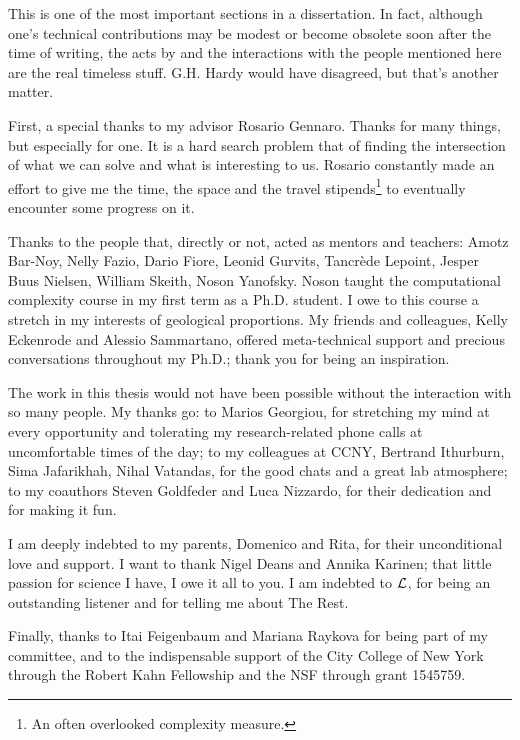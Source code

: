 %
%


This is one of the most important sections in a dissertation. In fact, although one's technical contributions may be modest or become obsolete soon after the time of writing, the acts by and the interactions with the people mentioned here are the real timeless stuff. G.H. Hardy would have disagreed, but that's another matter.

First, a special thanks to my advisor Rosario Gennaro. Thanks for many things, but especially for one. It is a hard search problem that of finding the intersection of what we can solve and what is interesting to us. Rosario constantly made an effort to give me the time,  the space and the travel stipends\footnote{An often overlooked complexity measure.} to eventually encounter some progress on it. 

Thanks to the people that, directly or not, acted as mentors and teachers: Amotz Bar-Noy, Nelly Fazio, Dario Fiore, Leonid Gurvits, Tancr\`ede Lepoint, Jesper Buus Nielsen, William Skeith, Noson Yanofsky. Noson taught the computational complexity course in my first term as a Ph.D. student. I owe to this course a stretch in my interests of geological proportions. My friends and colleagues, Kelly Eckenrode and Alessio Sammartano, offered meta-technical support and precious conversations throughout my Ph.D.; thank you for being an inspiration.

The work in this thesis would not have been possible without the interaction with so many people. My thanks go: to Marios Georgiou, for stretching my mind at every opportunity and tolerating my research-related phone calls at uncomfortable times of the day;
to my colleagues at CCNY, Bertrand Ithurburn, Sima Jafarikhah, Nihal Vatandas, for the good chats and a great lab atmosphere; 
to my coauthors Steven Goldfeder and Luca Nizzardo, for their dedication and for making it fun. 

I am deeply indebted to my parents, Domenico and Rita, for their unconditional love and support. I want to thank Nigel Deans and Annika Karinen; that little passion for science I have, I owe it all to you. I am indebted to $\cal{L}$, for being an outstanding listener and for telling me about The Rest. 

Finally, thanks to Itai Feigenbaum and Mariana Raykova for being part of my committee, and to the indispensable support of the City College of New York through the Robert Kahn Fellowship and the NSF through grant 1545759.

\restoregeometry



